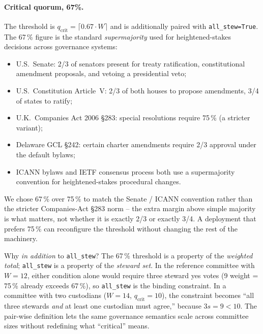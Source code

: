 \documentclass[10pt,twocolumn]{article}
\begin{document}
\paragraph{Critical quorum, 67\%.}
The threshold is $q_{\text{crit}} = \lceil 0.67 \cdot W \rceil$
and is additionally paired with \texttt{all\_stew=True}. The 67\,\%
figure is the standard \emph{supermajority} used for
heightened-stakes decisions across governance systems:

\begin{itemize}[leftmargin=*,topsep=2pt,itemsep=1pt]
\item U.S.\ Senate: 2/3 of senators present for treaty ratification,
  constitutional amendment proposals, and vetoing a presidential
  veto;
\item U.S.\ Constitution Article~V: 2/3 of both houses to propose
  amendments, 3/4 of states to ratify;
\item U.K.\ Companies Act 2006 \S283: special resolutions require
  75\,\% (a stricter variant);
\item Delaware GCL \S242: certain charter amendments require 2/3
  approval under the default bylaws;
\item ICANN bylaws and IETF consensus process both use a
  supermajority convention for heightened-stakes procedural
  changes.
\end{itemize}

We chose 67\,\% over 75\,\% to match the Senate / ICANN
convention rather than the stricter Companies-Act \S283 norm --
the extra margin above simple majority is what matters, not
whether it is exactly 2/3 or exactly 3/4. A deployment that
prefers 75\,\% can reconfigure the threshold without changing
the rest of the machinery.

Why \emph{in addition} to \texttt{all\_stew}? The 67\,\% threshold
is a property of the \emph{weighted total}; \texttt{all\_stew} is
a property of the \emph{steward set}. In the reference committee
with $W=12$, either condition alone would require three steward
yes votes (9 weight = 75\,\% already exceeds 67\,\%), so
\texttt{all\_stew} is the binding constraint. In a committee with
two custodians ($W=14$, $q_{\text{crit}}=10$), the constraint
becomes ``all three stewards \emph{and} at least one custodian
must agree,'' because $3s=9 < 10$. The pair-wise definition lets
the same governance semantics scale across committee sizes
without redefining what ``critical'' means.
\end{document}
